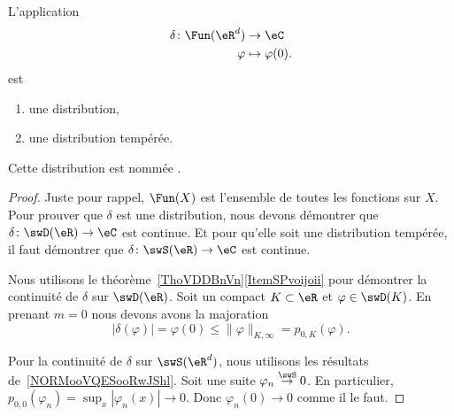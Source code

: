 \begin{lemmaDef}      \label{DEFooUSTNooYEZfPN}
	L'application
	\begin{equation}
		\begin{aligned}
			\delta\colon \Fun(\eR^d) & \to \eC             \\
			\varphi                  & \mapsto \varphi(0).
		\end{aligned}
	\end{equation}
	est
	\begin{enumerate}
		\item
		      une distribution,
		\item
		      une distribution tempérée.
	\end{enumerate}
	Cette distribution est nommée .
\end{lemmaDef}

\begin{proof}
	Juste pour rappel, \( \Fun(X)\) est l'ensemble de toutes les fonctions sur \( X\). Pour prouver que \( \delta\) est une distribution, nous devons démontrer que \( \delta\colon \swD(\eR)\to \eC\) est continue. Et pour qu'elle soit une distribution tempérée, il faut démontrer que \( \delta\colon \swS(\eR)\to \eC\) est continue.

	Nous utilisons le théorème~\ref{ThoVDDBnVn}\ref{ItemSPvoijoii} pour démontrer la continuité de \( \delta\) sur \( \swD(\eR)\). Soit un compact \( K\subset \eR\) et \( \varphi\in \swD(K)\). En prenant \( m=0\) nous devons avons la majoration
	\begin{equation}
		| \delta(\varphi)|=\varphi(0) \leq \| \varphi \|_{K,\infty}=p_{0,K}(\varphi).
	\end{equation}

	Pour la continuité de \( \delta\) sur \( \swS(\eR^d)\), nous utilisons les résultats de~\ref{NORMooVQESooRwJShl}. Soit une suite \( \varphi_n\stackrel{\swS}{\to}0\). En particulier, \( p_{0,0}(\varphi_n)=\sup_x| \varphi_n(x) |\to 0\). Donc \( \varphi_n(0)\to 0\) comme il le faut.
\end{proof}

